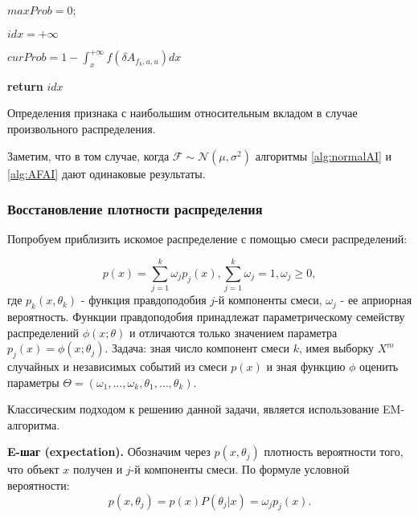 \documentclass[12pt,a4paper]{report}
\begin{document}
\begin{algorithm}[H]
\SetAlgoLined
{}

$maxProb = 0$;

$idx = +\infty$

 {

$curProb = 1 - \int_{x}^{+\infty}f(\delta A_{f_k, a, u})dx$

}

\textbf{return} $idx$
\caption{Определения признака с наибольшим относительным вкладом в случае произвольного распределения.}
\label{alg:AFAI}
\end{algorithm}

Заметим, что в том случае, когда $\mathcal{F} \sim \mathcal{N}(\mu, \sigma^2)$ алгоритмы \ref{alg:normalAI} и \ref{alg:AFAI} дают одинаковые результаты.

\subsubsection{Восстановление плотности распределения}
Попробуем приблизить искомое распределение с помощью смеси распределений:

\begin{equation*}
p(x) = \sum_{j=1}^{k}\omega_jp_j(x), \sum_{j=1}^{k}\omega_j = 1, \omega_j \ge 0, 
\end{equation*}
где $p_k(x, \theta_k)$ - функция правдоподобия $j$-й компоненты смеси, $\omega_j$ - ее априорная вероятность. Функции правдоподобия принадлежат параметрическому семейству распределений $\phi(x; \theta)$ и отличаются только значением параметра $p_j(x) = \phi(x; \theta_j)$.
Задача: зная число компонент смеси $k$, имея выборку $X^m$ случайных и независимых событий из смеси $p(x)$ и зная функцию $\phi$ оценить параметры $\Theta = (\omega_1, \dots, \omega_k, \theta_1, \dots, \theta_k)$.

Классическим подходом к решению данной задачи, является использование EM-алгоритма.

\textbf{E-шаг (expectation).}
Обозначим через $p(x, \theta_j)$ плотность вероятности того, что объект $x$ получен и $j$-й компоненты смеси. По формуле условной вероятности:
\begin{equation*}
p(x, \theta_j) = p(x)P(\theta_j|x) = \omega_jp_j(x).
\end{equation*} 
\end{document}
